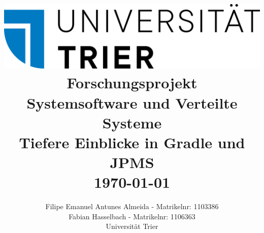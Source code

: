 
\title{ \normalsize \textsc{}
	\includegraphics[scale=0.25]{Universitaet_Trier_Logo_2021.png}
	\\ [3.0cm]
	\LARGE \textbf{Forschungsprojekt}   \\
	\LARGE \textbf{Systemsoftware und Verteilte Systeme}  \\ [0.2cm]
	\Large Tiefere Einblicke in Gradle und JPMS	\\ [0.5cm]
	\normalsize \today \vspace*{5\baselineskip}
}

\date{}

\author{
	Filipe Emanuel Antunes Almeida - Matrikelnr: 1103386  \\
	Fabian Hasselbach - Matrikelnr: 1106363  \\ [0.5cm]
	Universität Trier 
}

\maketitle
\newpage
\tableofcontents	
\newpage

\setcounter{page}{1} 		%